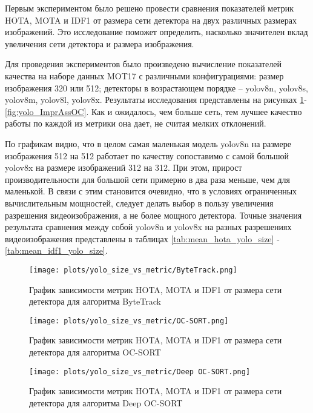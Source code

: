 Первым экспериментом было решено провести сравнения показателей метрик HOTA, MOTA и IDF1 от размера сети детектора на двух различных размерах изображений. Это исследование поможет определить, насколько значителен вклад увеличения сети детектора и размера изображения. 

Для проведения экспериментов было произведено вычисление показателей качества на наборе данных MOT17 с различными конфигурациями: размер изображения 320 или 512; детекторы в возрастающем порядке -- yolov8n, yolov8s, yolov8m, yolov8l, yolov8x. Результаты исследования представлены на рисунках \ref{fig:yolo_ByteTrack}-\ref{fig:yolo_ImprAssOC}. Как и ожидалось, чем больше сеть, тем лучшее качество работы по каждой из метрики она дает, не считая мелких отклонений.

По графикам видно, что в целом самая маленькая модель yolov8n на размере изображения 512 на 512 работает по качеству сопоставимо с самой большой yolov8x на размере изображений 312 на 312. При этом, прирост производительности для большой сети примерно в два раза меньше, чем для маленькой.
В связи с этим становится очевидно, что в условиях ограниченных вычислительным мощностей, следует делать выбор в пользу увеличения разрешения видеоизображения, а не более мощного детектора.
Точные значения результата сравнения между собой yolov8n и yolov8x на разных разрешениях видеоизображения представлены в таблицах \ref{tab:mean_hota_yolo_size} - \ref{tab:mean_idf1_yolo_size}.

\begin{figure}[ht]
    \centering
    \texttt{[image: plots/yolo\_size\_vs\_metric/ByteTrack.png]}
    \caption{График зависимости метрик HOTA, MOTA и IDF1 от размера сети детектора для алгоритма ByteTrack}
    \label{fig:yolo_ByteTrack}
\end{figure}

\begin{figure}[ht]
    \centering
    \texttt{[image: plots/yolo\_size\_vs\_metric/OC-SORT.png]}
    \caption{График зависимости метрик HOTA, MOTA и IDF1 от размера сети детектора для алгоритма OC-SORT}
    \label{fig:yolo_OC-SORT}
\end{figure}

\begin{figure}[ht]
    \centering
    \texttt{[image: plots/yolo\_size\_vs\_metric/Deep OC-SORT.png]}
    \caption{График зависимости метрик HOTA, MOTA и IDF1 от размера сети детектора для алгоритма Deep OC-SORT}
    \label{fig:yolo_Deep OC-SORT}
\end{figure}

